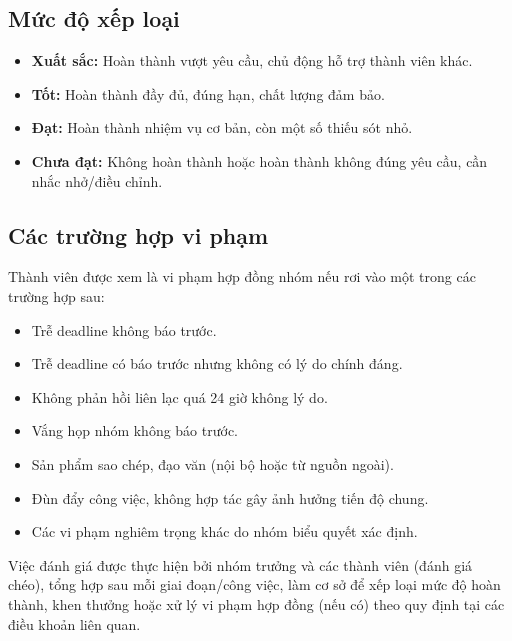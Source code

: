 \subsection{Mức độ xếp loại}

\begin{itemize}
    \item \textbf{Xuất sắc:} Hoàn thành vượt yêu cầu, chủ động hỗ trợ thành viên khác.
    \item \textbf{Tốt:} Hoàn thành đầy đủ, đúng hạn, chất lượng đảm bảo.
    \item \textbf{Đạt:} Hoàn thành nhiệm vụ cơ bản, còn một số thiếu sót nhỏ.
    \item \textbf{Chưa đạt:} Không hoàn thành hoặc hoàn thành không đúng yêu cầu, cần nhắc nhở/điều chỉnh.
\end{itemize}

\subsection{Các trường hợp vi phạm}

Thành viên được xem là vi phạm hợp đồng nhóm nếu rơi vào một trong các trường hợp sau:

\begin{itemize}
    \item Trễ deadline không báo trước.
    \item Trễ deadline có báo trước nhưng không có lý do chính đáng.
    \item Không phản hồi liên lạc quá 24 giờ không lý do.
    \item Vắng họp nhóm không báo trước.
    \item Sản phẩm sao chép, đạo văn (nội bộ hoặc từ nguồn ngoài).
    \item Đùn đẩy công việc, không hợp tác gây ảnh hưởng tiến độ chung.
    \item Các vi phạm nghiêm trọng khác do nhóm biểu quyết xác định.
\end{itemize}

Việc đánh giá được thực hiện bởi nhóm trưởng và các thành viên (đánh giá chéo), tổng hợp sau mỗi giai đoạn/công việc, làm cơ sở để xếp loại mức độ hoàn thành, khen thưởng hoặc xử lý vi phạm hợp đồng (nếu có) theo quy định tại các điều khoản liên quan.